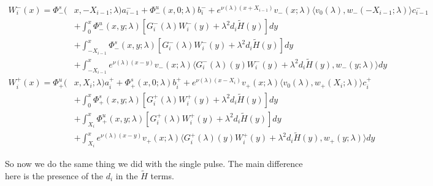 \documentclass[12pt]{article}
\begin{document}
\begin{align*}
W_i^-(x) = \Phi^s_-(&x, -X_{i-1}; \lambda)a_{i-1}^- + \Phi^u_-(x, 0; \lambda)b_i^- + e^{\nu(\lambda)(x+X_{i-1})} v_-(x; \lambda) \langle v_0(\lambda), w_-(-X_{i-1}; \lambda) \rangle c_{i-1}^- \\
&+ \int_0^x \Phi^u_-(x, y; \lambda)[ G_i^-(\lambda)W_i^-(y) + \lambda^2 d_i \tilde{H}(y) ] dy \\
&+ \int_{-X_{i-1}}^x \Phi^s_-(x, y; \lambda) [ G_i^-(\lambda)W_i^-(y) + \lambda^2 d_i \tilde{H}(y) ] dy \\
&+ \int_{-X_{i-1}}^x 
e^{\nu(\lambda)(x-y)} v_-(x; \lambda) \langle G_i^-(\lambda)(y)W_i^-(y) + \lambda^2 d_i \tilde{H}(y), w_-(y; \lambda) \rangle dy \\
W_i^+(x) = \Phi^u_+(&x, X_i; \lambda)a_i^+ + \Phi^s_+(x, 0; \lambda)b_i^+ + e^{\nu(\lambda)(x - X_i)} v_+(x; \lambda) \langle v_0(\lambda), w_+(X_i; \lambda) \rangle c_i^+ \\
&+ \int_0^x \Phi^s_+(x, y; \lambda) [ G_i^+(\lambda)W_i^+(y) + \lambda^2 d_i \tilde{H}(y) ] dy \\
&+ \int_{X_i}^x \Phi^u_+(x, y; \lambda) [ G_i^+(\lambda)W_i^+(y) + \lambda^2 d_i \tilde{H}(y) ] dy \\
&+ \int_{X_i}^x e^{\nu(\lambda)(x-y)} v_+(x; \lambda) \langle G_i^+(\lambda)(y)W_i^+(y) + \lambda^2 d_i \tilde{H}(y), w_+(y; \lambda) \rangle dy
\end{align*}

So now we do the same thing we did with the single pulse. The main difference here is the presence of the $d_i$ in the $\tilde{H}$ terms. 
\end{document}

